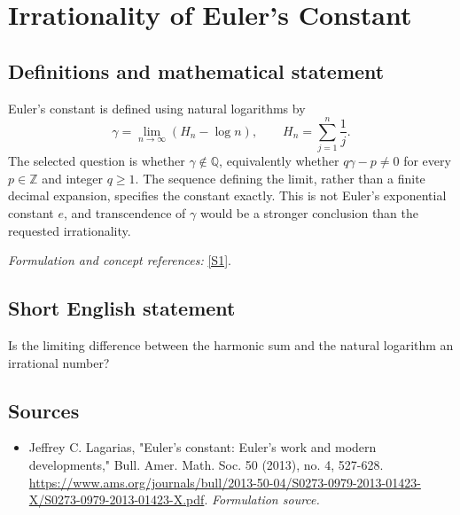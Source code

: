 \documentclass[11pt]{article}
\begin{document}
\section*{\texorpdfstring{Irrationality of Euler's Constant}{Irrationality of Euler's Constant}}\label{286}
\subsection{Definitions and mathematical statement}
Euler's constant is defined using natural logarithms by
\[
 \gamma=\lim_{n\to\infty}\left(H_n-\log n\right),
 \qquad H_n=\sum_{j=1}^n\frac1j.
\]
The selected question is whether $\gamma\notin{\mathbb{Q}}$, equivalently whether
$q\gamma-p\ne0$ for every $p\in{\mathbb{Z}}$ and integer $q\ge1$. The sequence defining the limit, rather than a finite decimal expansion, specifies the constant exactly. This is not Euler's exponential constant $e$, and transcendence of $\gamma$ would be a stronger conclusion than the requested irrationality.
\par\smallskip\textit{Formulation and concept references:} \href{https://www.ams.org/journals/bull/2013-50-04/S0273-0979-2013-01423-X/S0273-0979-2013-01423-X.pdf}{[S1]}.

\subsection{Short English statement}
Is the limiting difference between the harmonic sum and the natural logarithm an irrational number?
\subsection{Sources}
\begin{itemize}
\item[S1]Jeffrey C. Lagarias, "Euler's constant: Euler's work and modern developments," Bull. Amer. Math. Soc. 50 (2013), no. 4, 527-628.
\url{https://www.ams.org/journals/bull/2013-50-04/S0273-0979-2013-01423-X/S0273-0979-2013-01423-X.pdf}.
\textit{Formulation source.}
\end{itemize}
\end{document}
